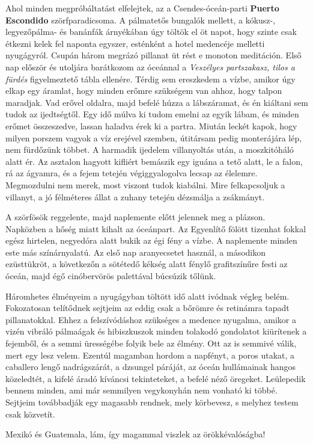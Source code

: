 Ahol minden megpróbáltatást elfelejtek, az a Csendes-óceán-parti
\textbf{Puerto Escondido} szörfparadicsoma. A pálmatetős bungalók mellett,
a kókusz-, legyezőpálma- és banánfák árnyékában úgy töltök el öt napot,
hogy szinte csak étkezni kelek fel naponta egyszer, esténként a
hotel medencéje melletti nyugágyról. Csupán három megrázó pillanat
üt rést e monoton meditáción. Első nap először és utoljára barátkozom
az óceánnal a \textit{Veszélyes partszakasz, tilos a fürdés} figyelmeztető
tábla ellenére. Térdig sem ereszkedem a vízbe, amikor úgy elkap egy áramlat,
hogy minden erőmre szükségem van ahhoz, hogy talpon maradjak.
Vad erővel oldalra, majd befelé húzza a lábszáramat, és én kiáltani sem
tudok az ijedtségtől. Egy idő múlva ki tudom emelni az egyik lábam,
és minden erőmet összeszedve, lassan haladva érek ki a partra. Miután
leckét kapok, hogy milyen porszem vagyok a víz erejével szemben, útitársam
pedig monterájára lép, nem fürdőzünk többet. A harmadik ijedelem
villanyoltás után, a moszkitóháló alatt ér. Az asztalon hagyott
kifliért bemászik egy iguána a tető alatt, le a falon, rá az ágyamra, és
a fejem tetején végiggyalogolva lecsap az élelemre.  Megmozdulni nem
merek, most viszont tudok kiabálni. Mire felkapcsoljuk a villanyt, a jó
félméteres állat a zuhany tetején dézsmálja a zsákmányt.

A szörfösök reggelente, majd naplemente előtt jelennek meg a plázson.
Napközben a hőség miatt kihalt az óceánpart. Az Egyenlítő fölött
tizenhat fokkal egész hirtelen, negyedóra alatt bukik az égi fény
a vízbe. A naplemente minden este más színárnyalatú. Az első nap
aranyecsetet használ, a másodikon ezüsttükröt, a következőn a sötétedő
kékség alatt fénylő grafitszínűre festi az óceán, majd égő cinóbervörös
palettával búcsúzik tőlünk.

Háromhetes élményeim a nyugágyban töltött idő alatt ivódnak végleg
belém. Fokozatosan telítődnek sejtjeim az eddig csak a bőrömre
és retinámra tapadt pillanatokkal. Ehhez a felszívódáshoz szükséges
a medence nyugalma, amikor a vizén vibráló pálmaágak és hibiszkuszok
minden tolakodó gondolatot kiürítenek a fejemből, és a semmi
ürességébe folyik bele az élmény. Ott az is semmivé válik, mert egy lesz
velem. Ezentúl magamban hordom a napfényt, a poros utakat, a caballero
lengő nadrágszárát, a dzsungel páráját, az óceán hullámainak
hangos közeledtét, a kifelé áradó kíváncsi tekinteteket, a befelé néző
öregeket. Leülepedik bennem minden, ami már semmilyen vegykonyhán
nem vonható ki többé. Sejtjeim továbbadják egy magasabb rendnek,
mely körbevesz, s melyhez testem csak közvetít.

Mexikó és Guatemala, lám, így magammal viszlek az örökkévalóságba!
